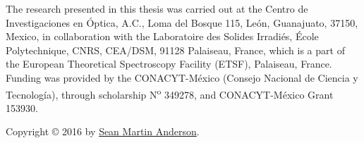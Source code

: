 \begin{titlingpage}
\null
\vfill
\parbox{0.7\textwidth}{
The research presented in this thesis was carried out at the Centro de
Investigaciones en \'Optica, A.C., Loma del Bosque 115, Le\'on, Guanajuato,
37150, Mexico, in collaboration with the Laboratoire des Solides Irradi\'es,
\'Ecole Polytechnique, CNRS, CEA/DSM, 91128 Palaiseau, France, which is a part
of the European Theoretical Spectroscopy Facility (ETSF), Palaiseau, France.
Funding was provided by the CONACYT-M\'exico (Consejo Nacional de Ciencia y
Tecnolog\'ia), through scholarship N\textsuperscript{o} 349278, and
CONACYT-M\'exico Grant 153930.

\vspace{1cm}

Copyright {\copyright{}} 2016 by 
\href{mailto:sean.martin.anderson@gmail.com}{Sean Martin Anderson}.
}
\end{titlingpage}
